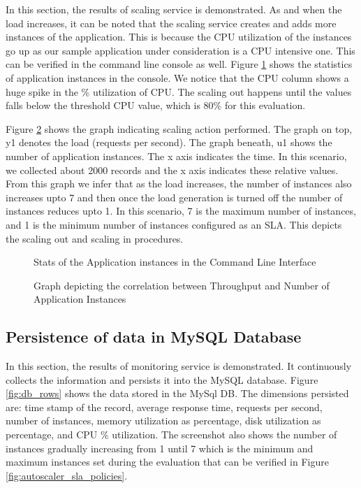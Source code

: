 \documentclass[article,type=msc,colorback,12pt,accentcolor=tud8b,table]{tudthesis}
\begin{document}
	In this section, the results of scaling service is demonstrated. As and when the load increases, it can be noted that the scaling service creates and adds more instances of the application. This is because the CPU utilization of the instances go up as our sample application under consideration is a CPU intensive one. This can be verified in the command line console as well. Figure \ref{fig:cf_cli} shows the statistics of application instances in the console. We notice that the CPU column shows a huge spike in the \% utilization of CPU. The scaling out happens until the values falls below the threshold CPU value, which is 80\% for this evaluation.
	
	Figure \ref{fig:responsetTime_Instances} shows the graph indicating scaling action performed. The graph on top, y1 denotes the load (requests per second). The graph beneath, u1 shows the number of application instances. The x axis indicates the time. In this scenario, we collected about 2000 records and the x axis indicates these relative values. From this graph we infer that as the load increases, the number of instances also increases upto 7 and then once the load generation is turned off the number of instances reduces upto 1. In this scenario, 7 is the maximum number of instances, and 1 is the minimum number of instances configured as an SLA. This depicts the scaling out and scaling in procedures. 
	
	  \begin{figure}[h]
	  	\begin{center}
	  		\makebox[\textwidth]{\texttt{[image: E4]}}
	  	\end{center}
	  	\caption{Stats of the Application instances in the Command Line Interface}
	  	\label{fig:cf_cli}
	  \end{figure}
	  
	  	  \begin{figure}[h]
	  	  	\begin{center}
	  	  		\makebox[\textwidth]{\texttt{[image: E5]}}
	  	  	\end{center}
	  	  	\caption{Graph depicting the correlation between Throughput and Number of Application Instances}
	  	  	\label{fig:responsetTime_Instances}
	  	  \end{figure}
	
	\subsection{Persistence of data in MySQL Database}
		In this section, the results of monitoring service is demonstrated. It continuously collects the information and persists it into the MySQL database.  Figure \ref{fig:db_rows} shows the data stored in the MySql DB. The dimensions persisted are: time stamp of the record, average response time, requests per second, number of instances, memory utilization as percentage, disk utilization as percentage, and CPU \% utilization. The screenshot also shows the number of instances gradually increasing from 1 until 7 which is the minimum and maximum instances set during the evaluation that can be verified in Figure \ref{fig:autoscaler_sla_policies}. 
	
\end{document}
